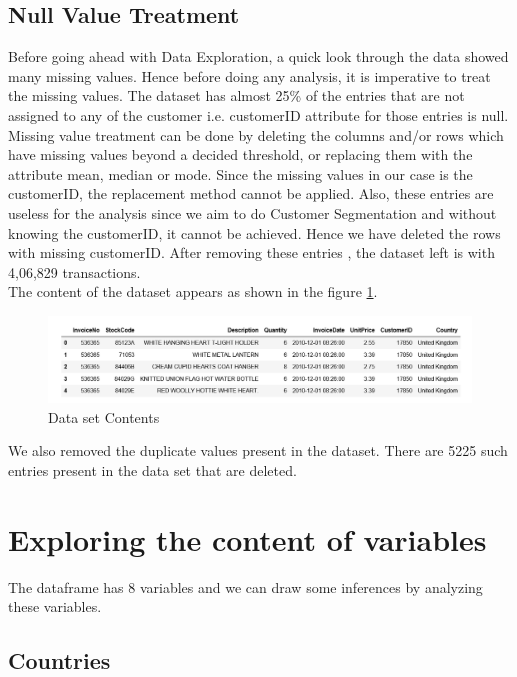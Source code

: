 \subsection{Null Value Treatment}
Before going ahead with Data Exploration, a quick look through the data showed many missing values. Hence before doing any analysis, it is imperative to treat the missing values. The dataset has almost 25\% of the entries that are not assigned to any of the customer i.e. customerID attribute for those entries is null. \\
Missing value treatment can be done by deleting the columns and/or rows which have missing values beyond a decided threshold, or replacing them with the attribute mean, median or mode. 
Since the missing values in our case is the customerID, the replacement method cannot be applied. Also, these entries are useless for the analysis since we aim to do Customer Segmentation and without knowing the customerID, it cannot be achieved. Hence we have deleted the rows with missing customerID. After removing these entries , the dataset left is with 4,06,829 transactions.\\

The content of the dataset appears as shown in the figure \ref{data}.

\begin{figure}[H]
\caption{Data set Contents}
\label{data}
\centering
\includegraphics[width=\columnwidth]{images/DatasetContent.PNG}
\end{figure}

We also removed the duplicate values present in the dataset. There are 5225 such entries present in the data set that are deleted.\\

\section{Exploring the content of variables}

The dataframe has 8 variables and we can draw some inferences by analyzing these variables.

\subsection{Countries}

